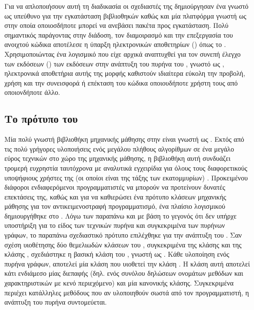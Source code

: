 Για να απλοποιήσουν αυτή τη διαδικασία οι σχεδιαστές της  δημιούργησαν ένα  γνωστό ως  υπεύθυνο για την εγκατάσταση βιβλιοθηκών καθώς και μία πλατφόρμα γνωστή ως  στην οποία οποιοσδήποτε μπορεί να ανεβάσει πακέτα προς εγκατάσταση.
Πολύ σημαντικός παράγοντας στην διάδοση, τον διαμοιρασμό και την επεξεργασία του ανοιχτού κώδικα αποτέλεσε η ύπαρξη ηλεκτρονικών αποθετηρίων () όπως το .
Χρησιμοποιώντας ένα λογισμικό που είχε αρχικά αναπτυχθεί για τον συνεπή έλεγχο των εκδόσεων () των εκδόσεων στην ανάπτυξη του πυρήνα του , γνωστό ως , ηλεκτρονικά αποθετήρια αυτής της μορφής καθιστούν ιδιαίτερα εύκολη την προβολή, χρήση και την συνεισφορά ή επέκταση του κώδικα οποιουδήποτε χρήστη τους από οποιονδήποτε άλλο.
\subsection{Το πρότυπο του }
Μία πολύ γνωστή βιβλιοθήκη μηχανικής μάθησης στην  είναι γνωστή ως .
Εκτός από τις πολύ γρήγορες υλοποιήσεις ενός μεγάλου πλήθους αλγορίθμων σε ένα μεγάλο εύρος τεχνικών στο χώρο της μηχανικής μάθησης, η βιβλιοθήκη αυτή συνδυάζει τρομερή ευχρηστία ταυτόχρονα με αναλυτικά εγχειρίδια για όλους τους διαφορετικούς υποψήφιους χρήστες της (οι οποίοι είναι της τάξης των εκατομμυρίων) \cite{scikit}.
Προκειμένου διάφοροι ενδιαφερόμενοι προγραμματιστές να μπορούν να προτείνουν δυνατές επεκτάσεις της, καθώς και για να καθιερώσει ένα πρότυπο κλάσεων μηχανικής μάθησης για τον αντικειμενοστραφή προγραμματισμό, ένα πλαίσιο λογισμικού  δημιουργήθηκε στο .
Λόγω των παραπάνω και με βάση το γεγονός ότι δεν υπήρχε υποστήριξη για το είδος των τεχνικών πυρήνα και συγκεκριμένα των πυρήνων γράφων, το παραπάνω σχεδιαστικό πρότυπο επιλέχθηκε για την ανάπτυξη του .
Σαν σχέση υιοθέτησης δύο θεμελιωδών κλάσεων του \texttt{}, συγκεκριμένα της κλάσης  και της κλάσης , σχεδιάστηκε η βασική κλάση του , γνωστή ως .
Κάθε υλοποίηση ενός πυρήνα γράφων, αποτελεί μία κλάση που υιοθετεί την κλάση . 
Η κλάση αυτή αποτελεί κάτι ενδιάμεσο μίας διεπαφής (δηλ. ενός συνόλου δηλώσεων ονομάτων μεθόδων και χαρακτηριστικών με κενό περιεχόμενο) και μία κανονικής κλάσης.
Συγκεκριμένα περιέχει κατάλληλες μεθόδους που αν υλοποιηθούν σωστά από τον προγραμματιστή, η ανάπτυξη του πυρήνα συντομεύεται.

